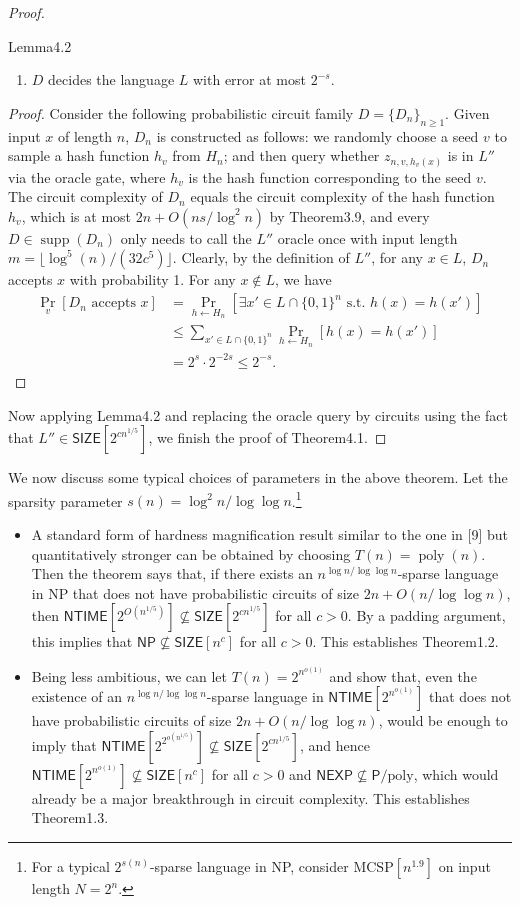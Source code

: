 \begin{proof}
\begin{authorclaim}{Lemma4.2}
\begin{enumerate}
\item $D$ decides the language $L$ with error at most $2^{-s}$.
\end{enumerate}
\end{authorclaim}
\begin{proof}
Consider the following probabilistic circuit family $D=\{D_n\}_{n\ge1}$. Given input $x$ of length $n$, $D_n$ is constructed as follows: we randomly choose a seed $v$ to sample a hash function $h_v$ from $H_n$; and then query whether $z_{n,v,h_v(x)}$ is in $L''$ via the oracle gate, where $h_v$ is the hash function corresponding to the seed $v$. The circuit complexity of $D_n$ equals the circuit complexity of the hash function $h_v$, which is at most $2n+O(ns/\log^2n)$ by Theorem3.9, and every $D\in\operatorname{supp}(D_n)$ only needs to call the $L''$ oracle once with input length $m=\lfloor\log^5(n)/(32c^5)\rfloor$. Clearly, by the definition of $L''$, for any $x\in L$, $D_n$ accepts $x$ with probability 1. For any $x\notin L$, we have
\begin{align*}
\Pr_v[D_n\text{ accepts }x]
&=\Pr_{h\leftarrow H_n}[\exists x'\in L\cap\{0,1\}^n\text{ s.t. }h(x)=h(x')]\\
&\le\sum_{x'\in L\cap\{0,1\}^n}\Pr_{h\leftarrow H_n}[h(x)=h(x')]\\
&=2^s\cdot2^{-2s}\le2^{-s}.
\end{align*}
\end{proof}
Now applying Lemma4.2 and replacing the oracle query by circuits using the fact that $L''\in\mathsf{SIZE}[2^{cn^{1/5}}]$, we finish the proof of Theorem4.1.
\end{proof}
We now discuss some typical choices of parameters in the above theorem. Let the sparsity parameter $s(n)=\log^2n/\log\log n$.\footnote{For a typical $2^{s(n)}$-sparse language in NP, consider $\mathrm{MCSP}[n^{1.9}]$ on input length $N=2^n$.}
\begin{itemize}
\item A standard form of hardness magnification result similar to the one in [9] but quantitatively stronger can be obtained by choosing $T(n)=\operatorname{poly}(n)$. Then the theorem says that, if there exists an $n^{\log n/\log\log n}$-sparse language in NP that does not have probabilistic circuits of size $2n+O(n/\log\log n)$, then $\mathsf{NTIME}[2^{O(n^{1/5})}]\not\subseteq\mathsf{SIZE}[2^{cn^{1/5}}]$ for all $c>0$. By a padding argument, this implies that $\mathsf{NP}\not\subseteq\mathsf{SIZE}[n^c]$ for all $c>0$. This establishes Theorem1.2.
\item Being less ambitious, we can let $T(n)=2^{n^{o(1)}}$ and show that, even the existence of an $n^{\log n/\log\log n}$-sparse language in $\mathsf{NTIME}[2^{n^{o(1)}}]$ that does not have probabilistic circuits of size $2n+O(n/\log\log n)$, would be enough to imply that $\mathsf{NTIME}[2^{2^{o(n^{1/5})}}]\not\subseteq\mathsf{SIZE}[2^{cn^{1/5}}]$, and hence $\mathsf{NTIME}[2^{n^{o(1)}}]\not\subseteq\mathsf{SIZE}[n^c]$ for all $c>0$ and $\mathsf{NEXP}\not\subseteq\mathsf P/\mathrm{poly}$, which would already be a major breakthrough in circuit complexity. This establishes Theorem1.3.
\end{itemize}
